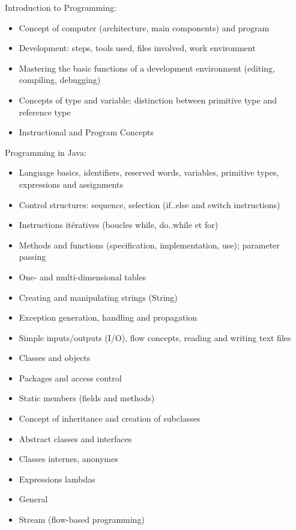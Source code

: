 Introduction to Programming:
\begin{itemize}
    \item Concept of computer (architecture, main components) and program
    \item Development: steps, tools used, files involved, work environment
    \item Mastering the basic functions of a development environment (editing, compiling, debugging)
    \item Concepts of type and variable; distinction between primitive type and reference type
    \item Instructional and Program Concepts
\end{itemize}
Programming in Java:
\begin{itemize}
    \item Language basics, identifiers, reserved words, variables, primitive types, expressions and assignments
    \item Control structures: sequence, selection (if..else and switch instructions)
    \item Instructions itératives (boucles while, do..while et for)
    \item Methods and functions (specification, implementation, use); parameter passing
    \item One- and multi-dimensional tables
    \item Creating and manipulating strings (String)
    \item Exception generation, handling and propagation
    \item Simple inputs/outputs (I/O), flow concepts, reading and writing text files
    \item Classes and objects
    \item Packages and access control
    \item Static members (fields and methods)
    \item Concept of inheritance and creation of subclasses
    \item Abstract classes and interfaces
    \item Classes internes, anonymes
    \item Expressions lambdas
    \item General
    \item Stream (flow-based programming)
\end{itemize}
